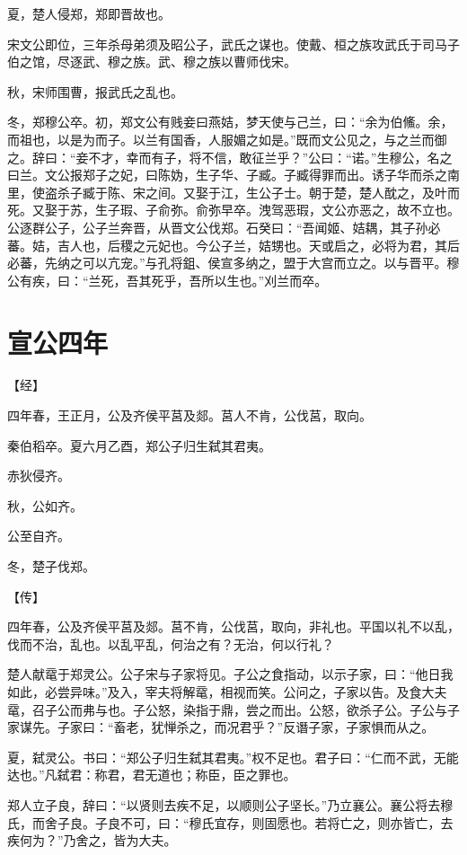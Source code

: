 \documentclass[a4paper,12pt,UTF8,twoside]{ctexbook}
\begin{document}
夏，楚人侵郑，郑即晋故也。

宋文公即位，三年杀母弟须及昭公子，武氏之谋也。使戴、桓之族攻武氏于司马子伯之馆，尽逐武、穆之族。武、穆之族以曹师伐宋。

秋，宋师围曹，报武氏之乱也。

冬，郑穆公卒。初，郑文公有贱妾曰燕姞，梦天使与己兰，曰：“余为伯鯈。余，而祖也，以是为而子。以兰有国香，人服媚之如是。”既而文公见之，与之兰而御之。辞曰：“妾不才，幸而有子，将不信，敢征兰乎？”公曰：“诺。”生穆公，名之曰兰。文公报郑子之妃，曰陈妫，生子华、子臧。子臧得罪而出。诱子华而杀之南里，使盗杀子臧于陈、宋之间。又娶于江，生公子士。朝于楚，楚人酖之，及叶而死。又娶于苏，生子瑕、子俞弥。俞弥早卒。洩驾恶瑕，文公亦恶之，故不立也。公逐群公子，公子兰奔晋，从晋文公伐郑。石癸曰：“吾闻姬、姞耦，其子孙必蕃。姞，吉人也，后稷之元妃也。今公子兰，姞甥也。天或启之，必将为君，其后必蕃，先纳之可以亢宠。”与孔将鉏、侯宣多纳之，盟于大宫而立之。以与晋平。穆公有疾，曰：“兰死，吾其死乎，吾所以生也。”刈兰而卒。


\section{宣公四年}



【经】

四年春，王正月，公及齐侯平莒及郯。莒人不肯，公伐莒，取向。

秦伯稻卒。夏六月乙酉，郑公子归生弑其君夷。

赤狄侵齐。

秋，公如齐。

公至自齐。

冬，楚子伐郑。

【传】

四年春，公及齐侯平莒及郯。莒不肯，公伐莒，取向，非礼也。平国以礼不以乱，伐而不治，乱也。以乱平乱，何治之有？无治，何以行礼？

楚人献鼋于郑灵公。公子宋与子家将见。子公之食指动，以示子家，曰：“他日我如此，必尝异味。”及入，宰夫将解鼋，相视而笑。公问之，子家以告。及食大夫鼋，召子公而弗与也。子公怒，染指于鼎，尝之而出。公怒，欲杀子公。子公与子家谋先。子家曰：“畜老，犹惮杀之，而况君乎？”反谮子家，子家惧而从之。

夏，弑灵公。书曰：“郑公子归生弑其君夷。”权不足也。君子曰：“仁而不武，无能达也。”凡弑君：称君，君无道也；称臣，臣之罪也。

郑人立子良，辞曰：“以贤则去疾不足，以顺则公子坚长。”乃立襄公。襄公将去穆氏，而舍子良。子良不可，曰：“穆氏宜存，则固愿也。若将亡之，则亦皆亡，去疾何为？”乃舍之，皆为大夫。
\end{document}
